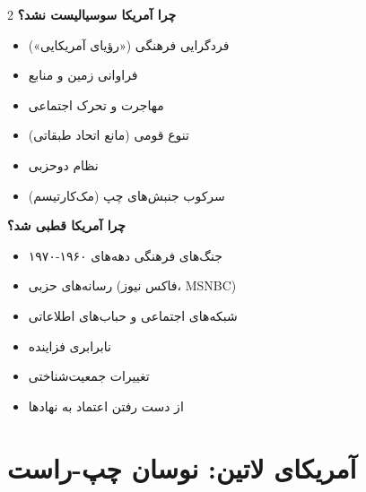 \begin{multicols}{2}
\textbf{چرا آمریکا سوسیالیست نشد؟}
\begin{itemize}
    \item فردگرایی فرهنگی («رؤیای آمریکایی»)
    \item فراوانی زمین و منابع
    \item مهاجرت و تحرک اجتماعی
    \item تنوع قومی (مانع اتحاد طبقاتی)
    \item نظام دوحزبی
    \item سرکوب جنبش‌های چپ (مک‌کارتیسم)
\end{itemize}

\textbf{چرا آمریکا قطبی شد؟}
\begin{itemize}
    \item جنگ‌های فرهنگی دهه‌های ۱۹۶۰-۱۹۷۰
    \item رسانه‌های حزبی (فاکس نیوز، MSNBC)
    \item شبکه‌های اجتماعی و حباب‌های اطلاعاتی
    \item نابرابری فزاینده
    \item تغییرات جمعیت‌شناختی
    \item از دست رفتن اعتماد به نهادها
\end{itemize}
\end{multicols}

\section*{آمریکای لاتین: نوسان چپ-راست}

